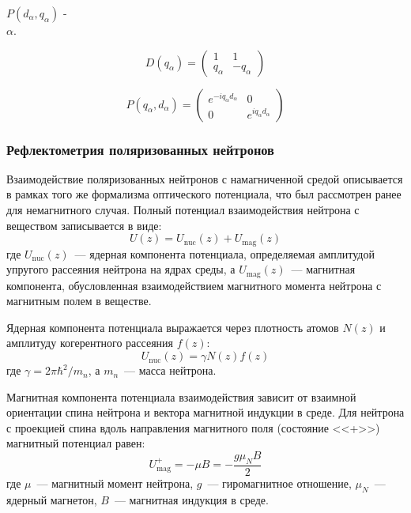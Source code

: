 \documentclass[a4paper]{article}
\begin{document}
$P(d_{\alpha} , q_{\alpha})$ - \\
 $\alpha$.

\begin{equation}
    D(q_{\alpha}) = 
\begin{pmatrix} %
1 & 1\\
q_{\alpha} & -q_{\alpha}
\end{pmatrix} %
\end{equation}

\begin{equation}
    P(q_{\alpha}, d_{\alpha}) = 
\begin{pmatrix} %
e^{-iq_{\alpha}d_{\alpha}} & 0\\
0 & e^{iq_{\alpha}d_{\alpha}}
\end{pmatrix} %
\end{equation}

\subsubsection{Рефлектометрия поляризованных нейтронов}
Взаимодействие поляризованных нейтронов с намагниченной средой описывается в рамках того же формализма оптического потенциала, что был рассмотрен ранее для немагнитного случая. Полный потенциал взаимодействия нейтрона с веществом записывается в виде:
\begin{equation}
U(z) = U_{\text{nuc}}(z) + U_{\text{mag}}(z)
\end{equation}
где $U_{\text{nuc}}(z)$~--- ядерная компонента потенциала, определяемая амплитудой упругого рассеяния нейтрона на ядрах среды, а $U_{\text{mag}}(z)$~--- магнитная компонента, обусловленная взаимодействием магнитного момента нейтрона с магнитным полем в веществе.

Ядерная компонента потенциала выражается через плотность атомов $N(z)$ и амплитуду когерентного рассеяния $f(z)$:
\begin{equation}
U_{\text{nuc}}(z) = \gamma N(z) f(z)
\end{equation}
где $\gamma = 2\pi\hbar^2/m_n$, а $m_n$~--- масса нейтрона.

Магнитная компонента потенциала взаимодействия зависит от взаимной ориентации спина нейтрона и вектора магнитной индукции в среде. Для нейтрона с проекцией спина вдоль направления магнитного поля (состояние <<+>>) магнитный потенциал равен:
\begin{equation}
U^+_{\text{mag}} = -\mu B = -\frac{g\mu_N B}{2}
\end{equation}
где $\mu$~--- магнитный момент нейтрона, $g$~--- гиромагнитное отношение, $\mu_N$~--- ядерный магнетон, $B$~--- магнитная индукция в среде.
\end{document}
